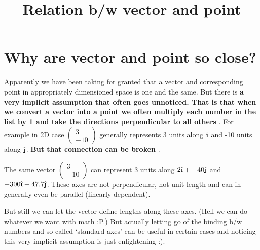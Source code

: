 \documentclass[12pt]{article}
\title{Relation b/w vector and point}
\author{}
\newcommand{\comment}[1]{}
\newcommand{\ihat}{\hat{\textbf{\i}}}
\newcommand{\jhat}{\hat{\textbf{\j}}}
\begin{document}
\maketitle

\section{Why are vector and point so close?}
Apparently we have been taking for granted that a vector and corresponding point in appropriately dimensioned space is one and the same. But there is \textbf{a very implicit assumption that often goes unnoticed. That is that when we convert a vector into a point we often multiply each number in the list by 1 and take the directions perpendicular to all others} . For example in 2D case $ \comment{Column-Vector: 3, -10} \begin{pmatrix} 3 \\  -10 \end{pmatrix} $ generally represents 3 units along $ \ihat $ and -10 units along $ \jhat $. \textbf{But that connection can be broken} .

The same vector $ \comment{Column-Vector: 3, -10} \begin{pmatrix} 3 \\  -10 \end{pmatrix} $ can represent 3 units along $ 2\ihat + -40\jhat $ and $ -300\ihat + 47.7\jhat $. These axes are not perpendicular, not unit length and can in generally even be parallel (linearly dependent).

But still we can let the vector define lengths along these axes. (Hell we can do whatever we want with math :P.) But actually letting go of the binding b/w numbers and so called `standard axes' can be useful in certain cases and noticing this very implicit assumption is just enlightening :).
\end{document}
